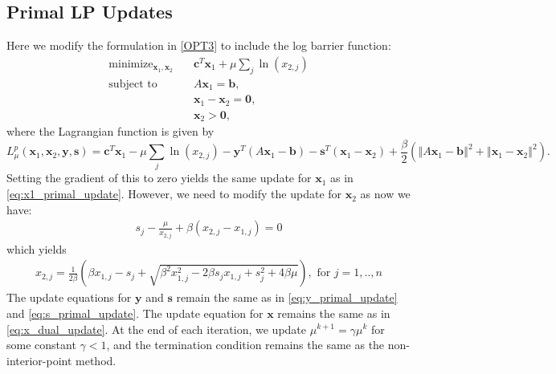 \documentclass{article}
\begin{document}
\subsection*{Primal LP Updates}
Here we modify the formulation in \eqref{OPT3} to include the log barrier function:
\begin{align}
\text{minimize}_{ \mathbf{x}_{1}, \mathbf{x}_{2}} &\quad \mathbf{c}^T\mathbf{x}_1 + \mu \sum_j \ln( {x}_{2,j} )\tag{OPT5}\label{OPT5} \\
\text{subject to  \ \  } &\quad  A \mathbf{x}_{1} = \mathbf{b},  \nonumber \\
&\quad \mathbf{x}_{1}  - \mathbf{x}_{2} = \mathbf{0}, \nonumber \\
&\quad \mathbf{x}_{2} > \mathbf{0}, \nonumber 
\end{align}
where the Lagrangian function is given by
\[
L_{\mu}^{p}(\mathbf{x}_{1},\mathbf{x}_{2},\mathbf{y}, \mathbf{s})=\mathbf{c}^{T}\mathbf{x}_{1}-\mu\sum_{j}\ln\left(x_{2,j}\right)-\mathbf{y}^{T}\left(A\mathbf{x}_{1}-\mathbf{b}\right)-\mathbf{s}^{T}\left(\mathbf{x}_{1}-\mathbf{x}_{2}\right)+\frac{\beta}{2}\left(\left\Vert A\mathbf{x}_{1}-\mathbf{b}\right\Vert ^{2}+\left\Vert \mathbf{x}_{1}-\mathbf{x}_{2}\right\Vert ^{2}\right).
\]
Setting the gradient of this to zero yields the same update for $\mathbf{x}_1$ as in \eqref{eq:x1_primal_update}.
However, we need to modify the update for $\mathbf{x}_2$ as now we have:
\begin{align}
s_j - \frac{\mu}{x_{2,j}} + \beta(x_{2,j} - x_{1,j}) = 0
\end{align}
which yields 
\begin{align}
x_{2,j} = \frac{1}{2\beta}\left(\beta x_{1,j} - s_j  + \sqrt{\beta^2 x_{1,j}^2 - 2\beta s_j x_{1,j} + s_j^2 + 4\beta\mu } \right), \text{ for $j = 1,..,n$}
\end{align}
The update equations for $\mathbf{y}$ and $\mathbf{s}$ remain the same as in \eqref{eq:y_primal_update} and \eqref{eq:s_primal_update}. 
The update equation for $\mathbf{x}$ remains the same as in \eqref{eq:x_dual_update}. At the end of each iteration, we update $\mu^{k+1} = \gamma \mu^k$ for some constant $\gamma<1$, and the termination condition remains the same as the non-interior-point method. 

\vspace{0.1in}
\end{document}
